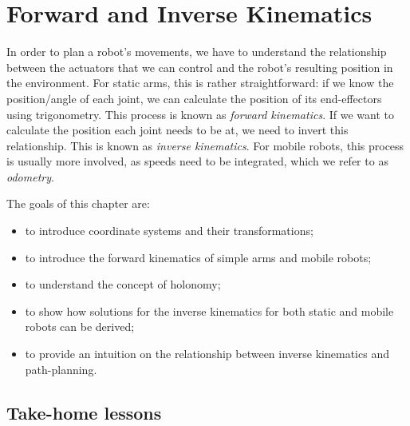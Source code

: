 \chapter{Forward and Inverse Kinematics}\label{chap:kinematics}
In order to plan a robot's movements, we have to understand the relationship between the actuators that we can control and the robot's resulting position in the environment. For static arms, this is rather straightforward: if we know the position/angle of each joint, we can calculate the position of its end-effectors using trigonometry. This process is known as \emph{forward kinematics}.  If we want to calculate the position each joint needs to be at, we need to invert this relationship. This is known as \emph{inverse kinematics}.  For mobile robots, this process is usually more involved, as speeds need to be integrated, which we refer to as \emph{odometry}.

The goals of this chapter are:

\begin{itemize}
\item to introduce coordinate systems and their transformations;
\item to introduce the forward kinematics of simple arms and mobile robots;
\item to understand the concept of holonomy;
\item to show how solutions for the inverse kinematics for both static and mobile robots can be derived;
\item to provide an intuition on the relationship between inverse kinematics and path-planning.
\end{itemize}







\section*{Take-home lessons}


